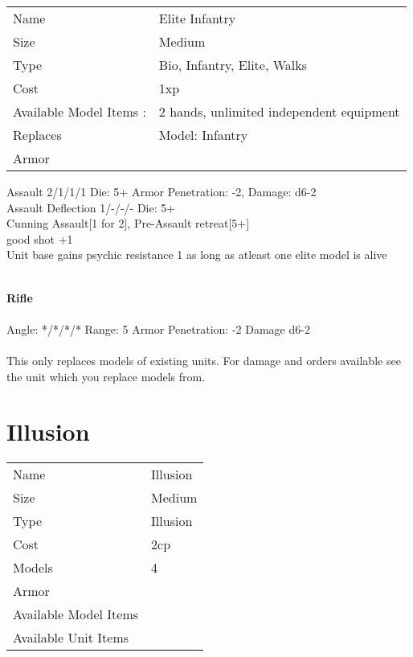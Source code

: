 \begin{tabular}{ll}
  Name & Elite Infantry \\
  Size & Medium\\
  Type & Bio, Infantry, Elite, Walks\\
  Cost & 1xp\\
  Available Model Items : &2 hands, unlimited independent equipment\\
  Replaces & Model: Infantry\\
  Armor & 
\end{tabular}



Assault 2/1/1/1 Die: 5+ Armor Penetration: -2, Damage: d6-2 \\
Assault Deflection 1/-/-/- Die: 5+\\
Cunning Assault[1 for 2], Pre-Assault retreat[5+]
\ \\

good shot +1\\ Unit base gains psychic resistance 1 as long as atleast one elite model is alive

\ \\
{\bf Rifle } \\
\ \\
Angle: */*/*/* Range: 5 Armor Penetration: -2 Damage d6-2 \\
\indent  \\





This only replaces models of existing units. For damage and orders available see the unit which you replace models from.



\pagebreak

\section{ Illusion }

\begin{tabular}{ll}
  Name & Illusion \\
  Size & Medium\\
  Type & Illusion\\
  Cost & 2cp\\
  Models & 4\\
  Armor & \\
  Available Model Items &  \\
  Available Unit Items &  \\
\end{tabular}

